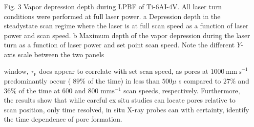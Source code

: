 \documentclass[10pt]{article}
\begin{document}
Fig. 3 Vapor depression depth during LPBF of Ti-6AI-4V. All laser turn conditions were performed at full laser power. a Depression depth in the steadystate scan regime where the laser is at full scan speed as a function of laser power and scan speed. b Maximum depth of the vapor depression during the laser turn as a function of laser power and set point scan speed. Note the different $Y$-axis scale between the two panels

window, $\tau_{\mathrm{p}}$ does appear to correlate with set scan speed, as pores at $1000 \mathrm{~mm} \mathrm{~s}^{-1}$ predominantly occur ( $89 \%$ of the time) in less than $500 \mu$ s compared to $27 \%$ and $36 \%$ of the time at 600 and 800 $\mathrm{mm} \mathrm{s}^{-1}$ scan speeds, respectively. Furthermore, the results show that while careful ex situ studies can locate pores relative to scan position, only time resolved, in situ X-ray probes can with certainty, identify the time dependence of pore formation.
\end{document}
